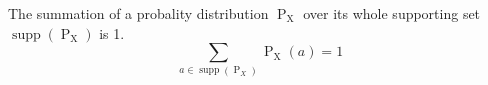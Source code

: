 The summation of a probality distribution $\operatorname{P}_{\operatorname{X}}$ over its whole supporting set $\operatorname{supp}(\operatorname{P}_{\operatorname{X}})$ is 1.
$$\sum\limits_{a \in \operatorname{supp}(\operatorname{P}_{X})} \operatorname{P}_{\operatorname{X}}(a) = 1$$ 
